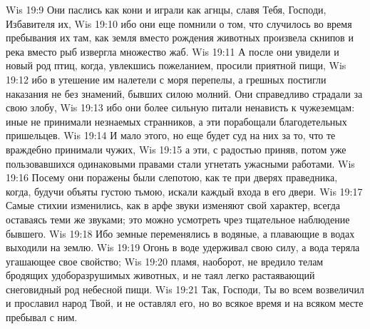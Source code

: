 \vs Wis 19:9 Они паслись как кони и играли как агнцы, славя Тебя, Господи, Избавителя их,
\vs Wis 19:10 ибо они еще помнили о том, что случилось во время пребывания их там, как земля вместо рождения  животных произвела скнипов и река вместо рыб извергла множество жаб.
\vs Wis 19:11 А после они увидели и новый род птиц, когда, увлекшись пожеланием, просили приятной пищи,
\vs Wis 19:12 ибо в утешение им налетели с моря перепелы, а грешных постигли наказания не без знамений, бывших силою молний. Они справедливо страдали за свою злобу,
\vs Wis 19:13 ибо они более сильную питали ненависть к чужеземцам: иные не принимали незнаемых странников, а эти порабощали благодетельных пришельцев.
\vs Wis 19:14 И мало этого, но еще будет суд на них за то, что те враждебно принимали чужих,
\vs Wis 19:15 а эти, с радостью приняв, потом уже пользовавшихся одинаковыми правами стали угнетать ужасными работами.
\vs Wis 19:16 Посему они поражены были слепотою, как те  при дверях праведника, когда, будучи объяты густою тьмою, искали каждый входа в его двери.
\vs Wis 19:17 Самые стихии изменились, как в арфе звуки изменяют свой характер, всегда оставаясь теми же звуками; это можно усмотреть чрез тщательное наблюдение бывшего.
\vs Wis 19:18 Ибо земные  переменялись в водяные, а плавающие в водах выходили на землю.
\vs Wis 19:19 Огонь в воде удерживал свою силу, а вода теряла угашающее свое свойство;
\vs Wis 19:20 пламя, наоборот, не вредило телам бродящих удоборазрушимых животных, и не таял легко растаявающий снеговидный род небесной пищи.
\vs Wis 19:21 Так, Господи, Ты во всем возвеличил и прославил народ Твой, и не оставлял его, но во всякое время и на всяком месте пребывал с ним.
